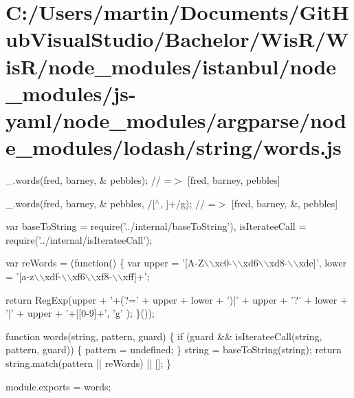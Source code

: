\hypertarget{_c_1_2_users_2martin_2_documents_2_git_hub_visual_studio_2_bachelor_2_wis_r_2_wis_r_2node_moduleacb465aa077df35f476c5ebd190c3ea0}{}\section{C\+:/\+Users/martin/\+Documents/\+Git\+Hub\+Visual\+Studio/\+Bachelor/\+Wis\+R/\+Wis\+R/node\+\_\+modules/istanbul/node\+\_\+modules/js-\/yaml/node\+\_\+modules/argparse/node\+\_\+modules/lodash/string/words.\+js}
\+\_\+.\+words(\textquotesingle{}fred, barney, \& pebbles\textquotesingle{}); // =$>$ \mbox{[}\textquotesingle{}fred\textquotesingle{}, \textquotesingle{}barney\textquotesingle{}, \textquotesingle{}pebbles\textquotesingle{}\mbox{]}

\+\_\+.\+words(\textquotesingle{}fred, barney, \& pebbles\textquotesingle{}, /\mbox{[}$^\wedge$, \mbox{]}+/g); // =$>$ \mbox{[}\textquotesingle{}fred\textquotesingle{}, \textquotesingle{}barney\textquotesingle{}, \textquotesingle{}\&\textquotesingle{}, \textquotesingle{}pebbles\textquotesingle{}\mbox{]}


\begin{DoxyCodeInclude}
var baseToString = require(\textcolor{stringliteral}{'../internal/baseToString'}),
    isIterateeCall = require(\textcolor{stringliteral}{'../internal/isIterateeCall'});

var reWords = (\textcolor{keyword}{function}() \{
  var upper = \textcolor{stringliteral}{'[A-Z\(\backslash\)\(\backslash\)xc0-\(\backslash\)\(\backslash\)xd6\(\backslash\)\(\backslash\)xd8-\(\backslash\)\(\backslash\)xde]'},
      lower = \textcolor{stringliteral}{'[a-z\(\backslash\)\(\backslash\)xdf-\(\backslash\)\(\backslash\)xf6\(\backslash\)\(\backslash\)xf8-\(\backslash\)\(\backslash\)xff]+'};

  \textcolor{keywordflow}{return} RegExp(upper + \textcolor{stringliteral}{'+(?='} + upper + lower + \textcolor{stringliteral}{')|'} + upper + \textcolor{charliteral}{'?'} + lower + \textcolor{charliteral}{'|'} + upper + \textcolor{stringliteral}{'+|[0-9]+'}, \textcolor{charliteral}{'g'}
      );
\}());

\textcolor{keyword}{function} words(\textcolor{keywordtype}{string}, pattern, guard) \{
  \textcolor{keywordflow}{if} (guard && isIterateeCall(\textcolor{keywordtype}{string}, pattern, guard)) \{
    pattern = undefined;
  \}
  \textcolor{keywordtype}{string} = baseToString(\textcolor{keywordtype}{string});
  \textcolor{keywordflow}{return} \textcolor{keywordtype}{string}.match(pattern || reWords) || [];
\}

module.exports = words;
\end{DoxyCodeInclude}
 